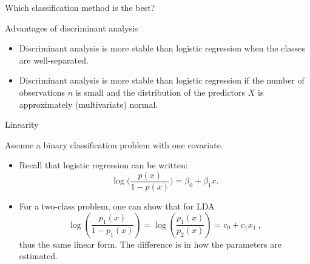 \documentclass[10pt,ignorenonframetext,]{beamer}
\providecommand{\tightlist}{%
  \setlength{\itemsep}{0pt}\setlength{\parskip}{0pt}}
\begin{document}
\begin{frame}{Which classification method is the best?}

\begin{block}{Advantages of discriminant analysis}

\begin{itemize}
\tightlist
\item
  Discriminant analysis is more stable than logistic regression when the
  classes are well-separated.
\item
  Discriminant analysis is more stable than logistic regression if the
  number of observations \(n\) is small and the distribution of the
  predictors \(X\) is approximately (multivariate) normal.
\end{itemize}

\end{block}

\end{frame}

\begin{frame}

\begin{block}{Linearity}

\vspace{2mm}

Assume a binary classification problem with one covariate.

\begin{itemize}
\item
  Recall that logistic regression can be written:
  \[\log \Big ( \frac{p(x)}{1-p(x)}\Big ) = \beta_0 + \beta_1 x.\]
\item
  For a two-class problem, one can show that for LDA
  \[\log\left(\frac{p_1(x)}{1-p_1(x)}\right) = \log\left(\frac{p_1(x)}{p_2(x)}\right) = c_0 + c_1 x_1 \ ,\]
  thus the same linear form. The difference is in how the parameters are
  estimated.
\end{itemize}

\end{block}

\end{frame}
\end{document}

